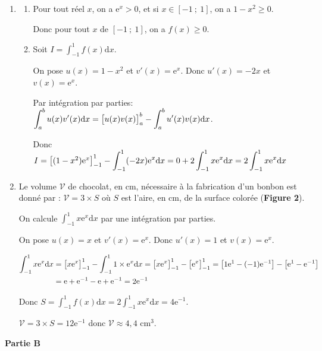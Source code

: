 \documentclass[10pt]{article}
\providecommand{\e}{{\mathrm{e}}}
\renewcommand{\d}{{\mathrm{d}}}
\providecommand{\ds}{\displaystyle}
\begin{document}
\begin{enumerate}
\item 
	\begin{enumerate}
		\item 
Pour tout réel $x$, on a $\e^{x}>0$, et si $x\in 	[-1~;~1]$, on a $1-x^2\geqslant 0$. 

Donc pour tout $x$ de $[-1~;~1]$, on a $f(x)\geqslant 0$.
		
		\item 
Soit $I= \ds\int_{-1}^1 f(x) \d x$.

On pose $u(x)=1-x^2$ et $v'(x)=\e^{x}$. Donc $u'(x)=-2x$ et $v(x)=\e^{x}$.

Par intégration par parties: $\ds\int_{a}^{b} u(x)v'(x) \d x = \left [ u(x)v(x)\strut\right ]_{a}^{b} - \ds\int_{a}^{b} u'(x)v(x) \d x$.

Donc $I= \left [ (1-x^2)\e^{x} \strut \right ]_{-1}^{1} - \ds\int_{-1}^{1} (-2x)\e^{x} \d x
= 0+2 \ds\int_{-1}^{1} x\e^{x} \d x =  2\ds\int_{-1}^{1} x\e^{x} \d x$
	\end{enumerate}
	
\item Le volume $\mathcal{V}$ de chocolat, en cm, nécessaire à la fabrication d'un bonbon est donné par :
$\mathcal{V} = 3 \times S$
où $S$ est l'aire, en cm, de la surface colorée (\textbf{Figure 2}).



On calcule $\ds\int_{-1}^{1} x\e^{x} \d x$ par une intégration par parties.

On pose $u(x)=x$ et $v'(x)=\e^{x}$. Donc $u'(x)=1$ et $v(x)=\e^{x}$.

$\begin{aligned}
\ds\int_{-1}^{1} x\e^{x} \d x
& = \left [ x \e^{x} \strut \right ]_{-1}^{1} - \ds\int_{-1}^{1} 1\times \e^{x} \d x
= \left [ x \e^{x} \strut \right ]_{-1}^{1} - \left [  \e^{x} \strut \right ]_{-1}^{1}
= \left [ 1 \e^{1} - (-1)\e^{-1} \strut \right ] -  \left [ \e^{1} - \e^{-1} \strut \right ]\\
& = \e + \e^{-1} -\e +\e^{-1} = 2 \e^{-1}
\end{aligned}$ 

Donc $S = \ds\int_{-1}^{1} f(x) \d x = 2 \ds\int_{-1}^{1} x\e^{x} \d x = 4 \e^{-1}$.

$\mathcal{V} = 3 \times S = 12\e^{-1}$ donc $\mathcal{V} \approx 4,4$ cm$^3$.
\end{enumerate}

\smallskip

\begin{center}
\textbf{Partie B}
\end{center}
\end{document}
